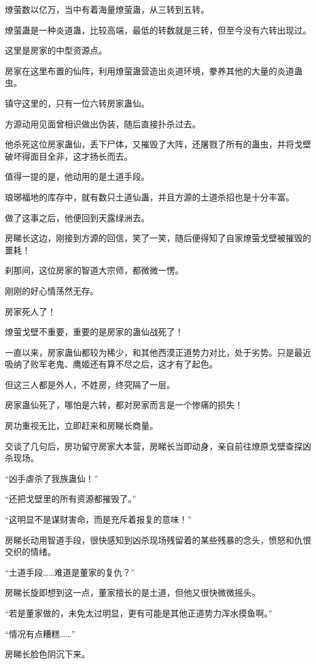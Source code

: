 \begin{this_body}
燎萤数以亿万，当中有着海量燎萤蛊，从三转到五转。

燎萤蛊是一种炎道蛊，比较高端，最低的转数就是三转，但至今没有六转出现过。

这里是房家的中型资源点。

房家在这里布置的仙阵，利用燎萤蛊营造出炎道环境，豢养其他的大量的炎道蛊虫。

镇守这里的，只有一位六转房家蛊仙。

方源动用见面曾相识做出伪装，随后直接扑杀过去。

他杀死这位房家蛊仙，丢下尸体，又摧毁了大阵，还屠戮了所有的蛊虫，并将戈壁破坏得面目全非，这才扬长而去。

值得一提的是，他动用的是土道手段。

琅琊福地的库存中，就有数只土道仙蛊，并且方源的土道杀招也是十分丰富。

做了这事之后，他便回到天露绿洲去。

房睇长这边，刚接到方源的回信，笑了一笑，随后便得知了自家燎萤戈壁被摧毁的噩耗！

刹那间，这位房家的智道大宗师，都微微一愣。

刚刚的好心情荡然无存。

房家死人了！

燎萤戈壁不重要，重要的是房家的蛊仙战死了！

一直以来，房家蛊仙都较为稀少，和其他西漠正道势力对比，处于劣势。只是最近吸纳了败军老鬼、鹰姬还有算不尽之后，这才有了起色。

但这三人都是外人，不姓房，终究隔了一层。

房家蛊仙死了，哪怕是六转，都对房家而言是一个惨痛的损失！

房功重视无比，立即赶来和房睇长商量。

交谈了几句后，房功留守房家大本营，房睇长当即动身，亲自前往燎原戈壁查探凶杀现场。

“凶手虐杀了我族蛊仙！”

“还把戈壁里的所有资源都摧毁了。”

“这明显不是谋财害命，而是充斥着报复的意味！”

房睇长动用智道手段，很快感知到凶杀现场残留着的某些残暴的念头，愤怒和仇恨交织的情绪。

“土道手段……难道是董家的复仇？”

房睇长旋即想到这一点，董家擅长的是土道，但他又很快微微摇头。

“若是董家做的，未免太过明显，更有可能是其他正道势力浑水摸鱼啊。”

“情况有点糟糕……”

房睇长脸色阴沉下来。


\end{this_body}
